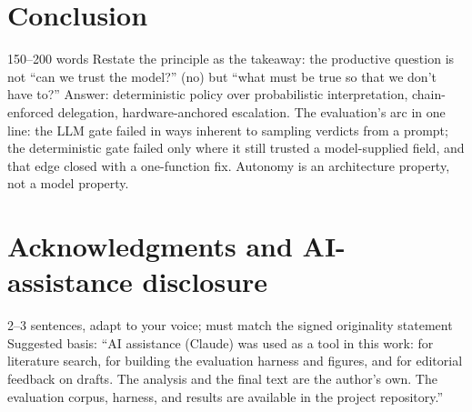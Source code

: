 \documentclass[11pt,a4paper]{article}
\begin{document}
\section{Conclusion}

\begin{towrite}{150--200 words}
Restate the principle as the takeaway: the productive question is not ``can we
trust the model?'' (no) but ``what must be true so that we don't have to?''
Answer: deterministic policy over probabilistic interpretation, chain-enforced
delegation, hardware-anchored escalation. The evaluation's arc in one line: the
LLM gate failed in ways inherent to sampling verdicts from a prompt; the
deterministic gate failed only where it still trusted a model-supplied field,
and that edge closed with a one-function fix. Autonomy is an architecture
property, not a model property.
\end{towrite}

\section*{Acknowledgments and AI-assistance disclosure}
\begin{towrite}{2--3 sentences, adapt to your voice; must match the signed originality statement}
Suggested basis: ``AI assistance (Claude) was used as a tool in this work: for
literature search, for building the evaluation harness and figures, and for
editorial feedback on drafts. The analysis and the final text are the
author's own. The evaluation corpus, harness, and results are available in the
project repository.''
\end{towrite}



\end{document}
